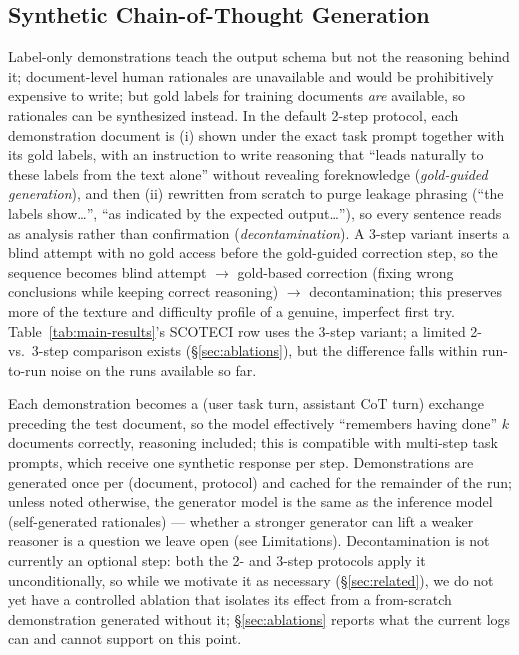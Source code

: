 \documentclass[11pt]{article}
\newcommand{\method}{SCOTECI}
\begin{document}
\subsection{Synthetic Chain-of-Thought Generation}
\label{sec:synthcot}
Label-only demonstrations teach the output schema but not the reasoning behind it;
document-level human rationales are unavailable and would be prohibitively
expensive to write; but gold labels for training documents \emph{are} available, so
rationales can be synthesized instead. In the default 2-step protocol, each
demonstration document is (i) shown under the exact task prompt together with its
gold labels, with an instruction to write reasoning that ``leads naturally to these
labels from the text alone'' without revealing foreknowledge (\emph{gold-guided
generation}), and then (ii) rewritten from scratch to purge leakage phrasing
(``the labels show\dots'', ``as indicated by the expected output\dots''), so every
sentence reads as analysis rather than confirmation (\emph{decontamination}). A
3-step variant inserts a blind attempt with no gold access before the gold-guided
correction step, so the sequence becomes blind attempt $\to$ gold-based correction
(fixing wrong conclusions while keeping correct reasoning) $\to$ decontamination;
this preserves more of the texture and difficulty profile of a genuine, imperfect
first try. Table~\ref{tab:main-results}'s \method{} row uses the 3-step variant; a
limited 2- vs.\ 3-step comparison exists (\S\ref{sec:ablations}), but the
difference falls within run-to-run noise on the runs available so far.

Each demonstration becomes a (user task turn, assistant CoT turn) exchange
preceding the test document, so the model effectively ``remembers having done'' $k$
documents correctly, reasoning included; this is compatible with multi-step task
prompts, which receive one synthetic response per step. Demonstrations are
generated once per (document, protocol) and cached for the remainder of the run;
unless noted otherwise, the generator model is the same as the inference model
(self-generated rationales) --- whether a stronger generator can lift a weaker
reasoner is a question we leave open (see Limitations). Decontamination is not
currently an optional step: both the 2- and 3-step protocols apply it
unconditionally, so while we motivate it as necessary (\S\ref{sec:related}), we do
not yet have a controlled ablation that isolates its effect from a
from-scratch demonstration generated without it; \S\ref{sec:ablations} reports
what the current logs can and cannot support on this point.
\end{document}
